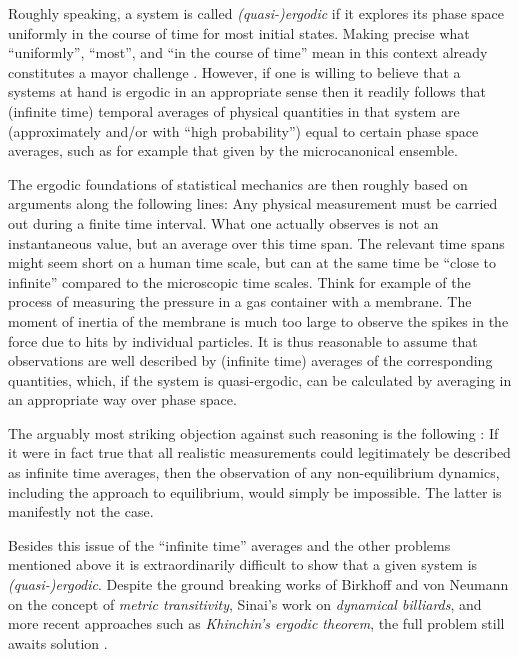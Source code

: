 \documentclass[a4paper,12pt,listof=totoc,index=totoc,bibliography=totoc,headsepline=false,headings=normal,BCOR16.153846mm,DIV12,headinclude,twoside,cleardoublepage=empty,numbers=noenddot,final]{scrreprt}
\theoremstyle{mystyle}
\numberwithin{equation}{section}
\numberwithin{figure}{section}
\numberwithin{lemma}{section}
\numberwithin{theorem}{section}
\numberwithin{corollary}{section}
\numberwithin{definition}{section}
\numberwithin{conjecture}{section}
\numberwithin{observation}{section}
\newcommand{\+}{\mkern2mu}
\DeclareMathOperator{\1}{\mathds{1}}
\begin{document}
Roughly speaking, a system is called \emph{(quasi-)ergodic} if it explores its phase space uniformly in the course of time for most initial states.
Making precise what ``uniformly'', ``most'', and ``in the course of time'' mean in this context already constitutes a mayor challenge \cite{UffinkFinal}.
However, if one is willing to believe that a systems at hand is ergodic in an appropriate sense then it readily follows that (infinite time) temporal averages of physical quantities in that system are (approximately and/or with ``high probability'') equal to certain phase space averages, such as for example that given by the microcanonical ensemble.

The ergodic foundations of statistical mechanics are then roughly based on arguments along the following lines:
Any physical measurement must be carried out during a finite time interval.
What one actually observes is not an instantaneous value, but an average over this time span.
The relevant time spans might seem short on a human time scale, but can at the same time be ``close to infinite'' compared to the microscopic time scales.
Think for example of the process of measuring the pressure in a gas container with a membrane.
The moment of inertia of the membrane is much too large to observe the spikes in the force due to hits by individual particles.
It is thus reasonable to assume that observations are well described by (infinite time) averages of the corresponding quantities, which, if the system is quasi-ergodic, can be calculated by averaging in an appropriate way over phase space.

The arguably most striking objection against such reasoning is the following \cite{Sklar1995}:
If it were in fact true that all realistic measurements could legitimately be described as infinite time averages, then the observation of any non-equilibrium dynamics, including the approach to equilibrium, would simply be impossible.
The latter is manifestly not the case.

Besides this issue of the ``infinite time'' averages and the other problems mentioned above it is extraordinarily difficult to show that a given system is \emph{(quasi-)ergodic}.
Despite the ground breaking works of Birkhoff and von Neumann on the concept of \emph{metric transitivity}, Sinai's work on \emph{dynamical billiards}, and more recent approaches such as \emph{Khinchin's ergodic theorem}, the full problem still awaits solution \cite{UffinkFinal}.
\end{document}
